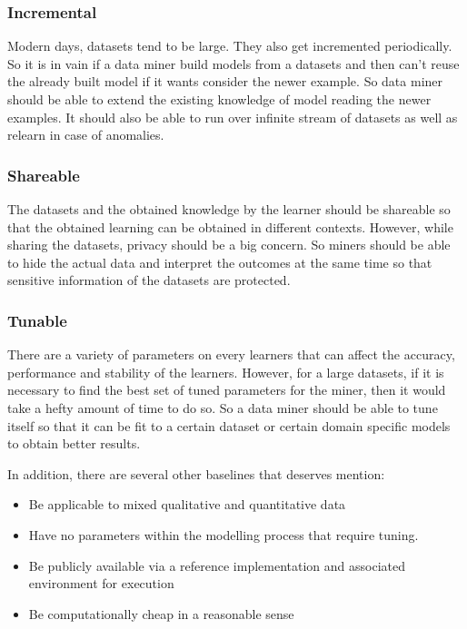 \documentclass[sigplan]{acmart}\settopmatter{printfolios=true,printccs=false,printacmref=false}
\begin{document}
\subsubsection{Incremental}
Modern days, datasets tend to be large. They also get incremented periodically. So it is in vain if a data miner build models from a datasets and then can't reuse the already built model if it wants consider the newer example. So data miner should be able to extend the existing knowledge of model reading the newer examples. It should also be able to run over infinite stream of datasets as well as relearn in case of anomalies. 

\subsubsection{Shareable}
The datasets and the obtained knowledge by the learner should be shareable so that the obtained learning can be obtained in different contexts. However, while sharing the datasets, privacy should be a big concern. So miners should be able to hide the actual data and interpret the outcomes at the same time so that sensitive information of the datasets are protected. 

\subsubsection{Tunable}
There are a variety of parameters on every learners that can affect the accuracy, performance and stability of the learners. However, for a large datasets, if it is necessary to find the best set of tuned parameters for the miner, then it would take a hefty amount of time to do so. So a data miner should be able to tune itself so that it can be fit to a certain dataset or certain domain specific models to obtain better results. 

In addition, there are several other baselines that deserves mention:
\begin{itemize}
	\item Be applicable to mixed qualitative and quantitative data
	\item Have no parameters within the modelling process that require tuning.
	\item Be publicly available via a reference implementation and associated environment for execution
	\item Be computationally cheap in a reasonable sense
\end{itemize}
\end{document}
